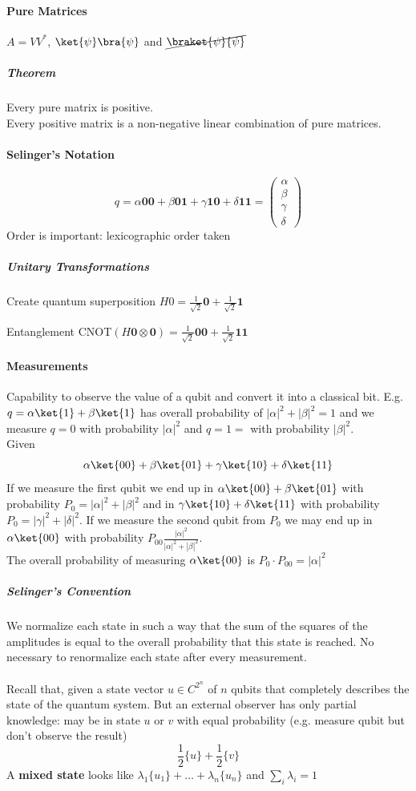 \documentclass[10pt]{report}
\begin{document}
\paragraph{Pure Matrices} $A = VV^*$, $\ket{\psi}\bra{\psi}$ and $\cancel{\braket{\psi}{\psi}}$
\subparagraph{Theorem} Every pure matrix is positive.\\
Every positive matrix is a non-negative linear combination of pure matrices.
\paragraph{Selinger's Notation}
$$q = \alpha\mathbf{00} + \beta\mathbf{01} + \gamma\mathbf{10} + \delta\mathbf{11} = \left(\begin{array}{c}
\alpha\\\beta\\\gamma\\\delta
\end{array}\right)$$
Order is important: lexicographic order taken
\subparagraph{Unitary Transformations}
\begin{list}{}{}
	\item Create quantum superposition $H0 = \frac{1}{\sqrt{2}}\mathbf{0} + \frac{1}{\sqrt{2}}\mathbf{1}$
	\item Entanglement CNOT$(H\mathbf{0}\otimes\mathbf{0})=\frac{1}{\sqrt{2}}\mathbf{00}+\frac{1}{\sqrt{2}}\mathbf{11}$
\end{list}
\paragraph{Measurements} Capability to observe the value of a qubit and convert it into a classical bit. E.g. $q = \alpha\ket{1}+\beta\ket{1}$ has overall probability of $|\alpha|^2+|\beta|^2=1$ and we measure $q=0$ with probability $|\alpha|^2$ and $q=1=$ with probability $|\beta|^2$.\\
Given 
$$\alpha\ket{00}+\beta\ket{01}+\gamma\ket{10}+\delta\ket{11}$$
If we measure the first qubit we end up in $\alpha\ket{00}+\beta\ket{01}$ with probability $P_0=|\alpha|^2+|\beta|^2$ and in $\gamma\ket{10}+\delta\ket{11}$ with probability $P_0=|\gamma|^2+|\delta|^2$. If we measure the second qubit from $P_0$ we may end up in $\alpha\ket{00}$ with probability $P_{00}\frac{|\alpha|^2}{|\alpha|^2+|\beta|^2}$.\\
The overall probability of measuring $\alpha\ket{00}$ is $P_{0}\cdot P_{00} = |\alpha|^2$
\subparagraph{Selinger's Convention} We normalize each state in such a way that the sum of the squares of the amplitudes is equal to the overall probability that this state is reached. No necessary to renormalize each state after every measurement.\\\\
Recall that, given a state vector $u\in C^{2^n}$ of $n$ qubits that completely describes the state of the quantum system. But an external observer has only partial knowledge: may be in state $u$ or $v$ with equal probability (e.g. measure qubit but don't observe the result)
$$\frac{1}{2}\{u\}+\frac{1}{2}\{v\}$$
A \textbf{mixed state} looks like $\lambda_1\{u_1\}+\ldots+\lambda_n\{u_n\}$ and $\sum_i \lambda_i = 1$
\end{document}
